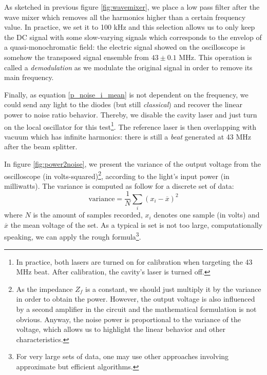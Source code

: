 \documentclass[11pt]{report}
\begin{document}
As sketched in previous figure \ref{fig:wavemixer}, we place a low pass filter after the wave mixer which removes all the harmonics higher than a certain frequency value. In practice, we set it to 100 kHz and this selection allows us to only keep the DC signal with some slow-varying signals which corresponds to the envelop of a quasi-monochromatic field: the electric signal showed on the oscilloscope is somehow the transposed signal ensemble from $43\pm 0.1$ MHz. This operation is called a \textit{demodulation} as we modulate the original signal in order to remove its main frequency.

Finally, as equation \eqref{p_noise_i_mean} is not dependent on the frequency, we could send any light to the diodes (but still \textit{classical}) and recover the linear power to noise ratio behavior. Thereby, we disable the cavity laser and just turn on the local oscillator for this test\footnote{In practice, both lasers are turned on for calibration when targeting the 43 MHz beat. After calibration, the cavity's laser is turned off.}. The reference laser is then overlapping with vacuum which has infinite harmonics: there is still a \textit{beat} generated at 43 MHz after the beam splitter.

In figure \ref{fig:power2noise}, we present the variance of the output voltage from the oscilloscope (in volts-squared)\footnote{As the impedance $Z_f$ is a constant, we should just multiply it by the variance in order to obtain the power. However, the output voltage is also influenced by a second amplifier in the circuit and the mathematical formulation is not obvious. Anyway, the noise power is proportional to the variance of the voltage, which allows us to highlight the linear behavior and other characteristics.}, according to the light's input power (in milliwatts). The variance is computed as follow for a discrete set of data:
\begin{equation}
\textrm{variance} = \frac{1}{N}\sum_{i} (x_i - \overline{x})^2
\end{equation}
where $N$ is the amount of samples recorded, $x_i$ denotes one sample (in volts) and $\overline{x}$ the mean voltage of the set. As a typical is set is not too large, computationally speaking, we can apply the rough formula\footnote{For very large sets of data, one may use other approaches involving approximate but efficient algorithms.}.
\end{document}
